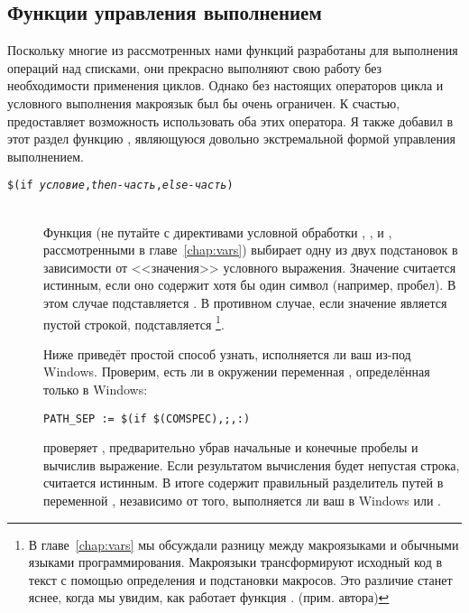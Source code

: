 \subsection{Функции управления выполнением}
\label{sec:flow_ctrl_func}

Поскольку многие из рассмотренных нами функций разработаны для
выполнения операций над списками, они прекрасно выполняют свою работу
без необходимости применения циклов. Однако без настоящих операторов
цикла и условного выполнения макроязык \GNUmake{} был бы очень
ограничен.  К счастью, \GNUmake{} предоставляет возможность
использовать оба этих оператора. Я также добавил в этот раздел функцию
, являющуюся довольно экстремальной формой управления
выполнением.

\begin{description}
\item[\texttt{\${}(if \emph{условие},\emph{then-часть},\emph{else-часть})}] \hfill \\
Функция  (не путайте с директивами условной обработки
, ,  и
, рассмотренными в главе~\ref{chap:vars}) выбирает
одну из двух подстановок в зависимости от <<значения>> условного
выражения.  Значение  считается истинным, если оно
содержит хотя бы один символ (например, пробел). В этом случае
подставляется . В противном случае, если
значение  является пустой строкой, подставляется
\footnote{ В главе~\ref{chap:vars} мы обсуждали
разницу между макроязыками и обычными языками программирования.
Макроязыки трансформируют исходный код в текст с помощью определения и
подстановки макросов. Это различие станет яснее, когда мы увидим, как
работает функция . (прим. автора)}.

Ниже приведёт простой способ узнать, исполняется ли ваш \Makefile{}
из-под Windows. Проверим, есть ли в окружении переменная
, определённая только в Windows:

{\footnotesize
\begin{verbatim}
PATH_SEP := $(if $(COMSPEC),;,:)
\end{verbatim}
}

\GNUmake{} проверяет , предварительно убрав
начальные и конечные пробелы и вычислив выражение. Если результатом
вычисления будет непустая строка,  считается
истинным. В итоге  содержит правильный разделитель
путей в переменной , независимо от того, выполняется ли
ваш \Makefile{} в Windows или \UNIX{}.


\end{description}
